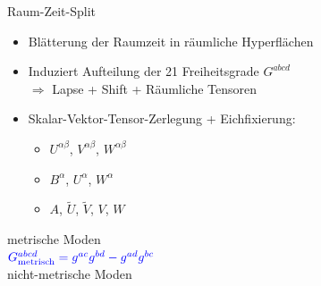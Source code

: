 \documentclass{beamer}
\begin{document}
    \begin{frame}{Raum-Zeit-Split}
        \begin{itemize}
            \item Blätterung der Raumzeit in räumliche Hyperflächen
            \item Induziert Aufteilung der 21 Freiheitsgrade $G^{abcd}$ \\ $\Rightarrow$ Lapse + Shift + Räumliche Tensoren
            \item Skalar-Vektor-Tensor-Zerlegung + Eichfixierung:
            \begin{itemize}
                \item {} {\color{blue}$U^{\alpha\beta}$}, {\color{alert}$V^{\alpha\beta}$}, {\color{alert}$W^{\alpha\beta}$}
                \item {} {\color{blue}$B^\alpha$}, {\color{alert}$U^\alpha$}, {\color{alert}$W^\alpha$}
                \item {} {\color{blue}$A$}, {\color{blue}$\tilde U$}, {\color{alert}$\tilde V$}, {\color{alert}$V$}, {\color{alert}$W$}
            \end{itemize}
        \end{itemize}
        \raggedleft
        {\color{blue}metrische Moden} \\
        $\color{blue}G_{\text{metrisch}}^{abcd} = g^{ac} g^{bd} - g^{ad} g^{bc}$ \\
        {\color{alert}nicht-metrische Moden}
    \end{frame}
\end{document}
